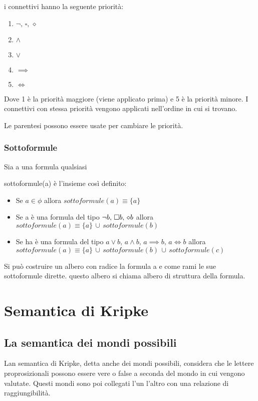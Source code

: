 i connettivi hanno la seguente priorità:
\begin{enumerate}
\item $\neg,\,\square,\,\diamond$
\item $\wedge$
\item $\vee$
\item $\implies$
\item $\iff$
\end{enumerate}
Dove 1 è la priorità maggiore (viene applicato prima) e 5 è la priorità
minore. I connettivi con stessa priorità vengono applicati nell'ordine
in cui si trovano.

Le parentesi possono essere usate per cambiare le priorità.


\subsubsection*{Sottoformule}

Sia a una formula qualsiasi

sottoformule(a) è l'insieme così definito:
\begin{itemize}
\item Se $a\in\phi$ allora $sottoformule(a)\equiv\{a\}$
\item Se a è una formula del tipo $\neg b,\,\square b,\,\diamond b$ allora $sottoformule(a)\equiv\{a\}\,\cup\, sottoformule(b)$
\item Se ha è una formula del tipo $a\vee b,\, a\wedge b,\, a\implies b,\, a\iff b$
allora $sottoformule(a)\equiv\{a\}\,\cup\, sottoformule(b)\,\cup\, sottoformule(c)$
\end{itemize}
Si può costruire un albero con radice la formula a e come rami le
sue sottoformule dirette. questo albero si chiama albero di struttura
della formula.


\section{Semantica di Kripke}


\subsection{La semantica dei mondi possibili}

Lan semantica di Kripke, detta anche dei mondi possibili, considera
che le lettere proprosizionali possono essere vere o false a seconda
del mondo in cui vengono valutate. Questi mondi sono poi collegati
l'un l'altro con una relazione di raggiungibilità.

